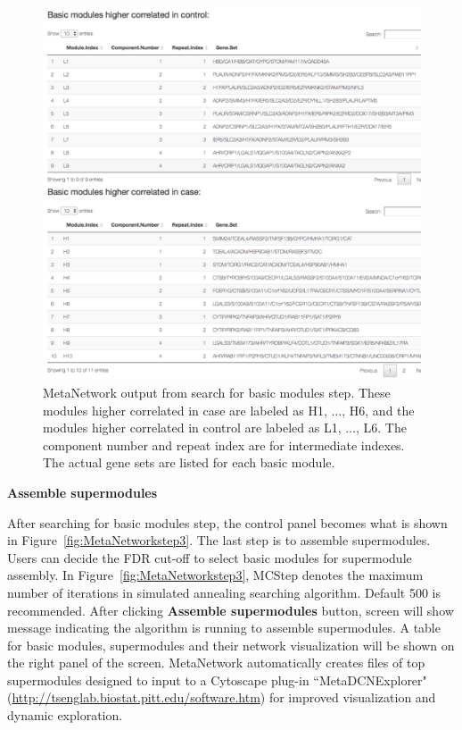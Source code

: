 \begin{steps}
\begin{figure}[H]
\begin{center}
\includegraphics[scale=0.9]{./figure/MetaNetwork/MetaNetworkBM.pdf}
\caption{MetaNetwork output from search for basic modules step.
These modules higher correlated in case are labeled as H1, $\ldots$, H6,
and the modules higher correlated in control are labeled as L1, $\ldots$, L6.
The component number and repeat index are for intermediate indexes.
The actual gene sets are listed for each basic module.
}
\label{fig:MetaNetworkBM}
\end{center}
\end{figure}

\item \textbf{Assemble supermodules}

After searching for basic modules step, 
the control panel becomes what is shown in Figure~\ref{fig:MetaNetworkstep3}. 
The last step is to assemble supermodules. 
Users can decide the FDR cut-off to select basic modules for supermodule assembly. 
In Figure~\ref{fig:MetaNetworkstep3}, 
MCStep denotes the maximum number of iterations in simulated annealing searching algorithm. Default 500 is recommended. 
After clicking \textbf{Assemble supermodules} button, screen will show message indicating the algorithm is running to assemble supermodules.
A table for basic modules, supermodules and their network visualization will be shown on the right panel of the screen.
MetaNetwork automatically creates files of top supermodules designed to input to a Cytoscape plug-in ``MetaDCNExplorer"
(\url{http://tsenglab.biostat.pitt.edu/software.htm}) for improved visualization and dynamic exploration.


\end{steps}
